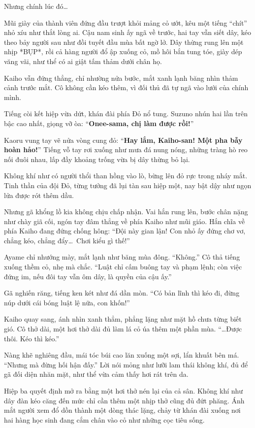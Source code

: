 \documentclass[../main.tex]{subfiles}
\begin{document}
Nhưng chính lúc đó\dots

Mũi giày của thành viên đứng đầu trượt khỏi mảng cỏ ướt, kêu một tiếng ``chít'' nhỏ xíu như thắt lòng ai.
Cậu nam sinh ấy ngã về trước, hai tay vẫn siết dây, kéo theo bảy người sau như đồi tuyết đầu mùa bất ngờ lở. Dây thừng rung lên một nhịp *BỤP*, rồi cả hàng người đổ ập xuống cỏ, mồ hôi bắn tung tóe, giày dép văng vãi, như thể có ai giật tấm thảm dưới chân họ.

Kaiho vẫn đứng thẳng, chỉ nhường nửa bước, mắt xanh lạnh băng nhìn thảm cảnh trước mắt. Cô không cần kéo thêm, vì đối thủ đã tự ngã vào lưới của chính mình.

Tiếng còi kết hiệp vừa dứt, khán đài phía Đỏ nổ tung. Suzuno nhún hai lần trên bậc cao nhất, giọng vỡ òa: ``\textbf{Onee-sama, chị làm được rồi!}''

Kaoru vung tay vẽ nửa vòng cung đỏ: ``\textbf{Hay lắm, Kaiho-san! Một pha bẫy hoàn hảo!}'' Tiếng vỗ tay rơi xuống như mưa đá nung nóng, những tràng hò reo nối đuôi nhau, lấp đầy khoảng trống vừa bị dây thừng bỏ lại.

Không khí như có người thổi than hồng vào lò, bừng lên đỏ rực trong nháy mắt. Tinh thần của đội Đỏ, từng tưởng đã lụi tàn sau hiệp một, nay bật dậy như ngọn lửa được rót thêm dầu.

Nhưng gã khổng lồ kia không chịu chấp nhận. Vai hắn rung lên, bước chân nặng như chày giã cối, ngón tay đâm thẳng về phía Kaiho như mũi giáo. Hắn chĩa về phía Kaiho đang đứng chống hông: ``Đội này gian lận! Con nhỏ ấy đứng chơ vơ, chẳng kéo, chẳng đẩy\dots\ Chơi kiểu gì thế!''

Ayame chỉ nhướng mày, mắt lạnh như băng mùa đông. ``Không.'' Cô thả tiếng xuống thềm cỏ, nhẹ mà chắc.
``Luật chỉ cấm buông tay và phạm lệnh; còn việc đứng im, nếu đôi tay vẫn ôm dây, là quyền của cậu ấy.''

Gã nghiến răng, tiếng ken két như đá dần mòn. ``Có bản lĩnh thì kéo đi, đừng núp dưới cái bóng luật lệ nữa, con khốn!''

Kaiho quay sang, ánh nhìn xanh thẳm, phẳng lặng như mặt hồ chưa từng biết gió. Cô thở dài, một hơi thở dài đủ làm lá cỏ úa thêm một phần mùa. ``\dots Được thôi. Kéo thì kéo.''

Nàng khẽ nghiêng đầu, mái tóc búi cao lăn xuống một sợi, lẩn khuất bên má. ``Nhưng mà đừng hối hận đấy.'' Lời nói mỏng như lưỡi lam thái không khí, đủ để gã đối diện nhăn mặt, như thể vừa cảm thấy hơi rát trên da.

\ct

Hiệp ba quyết định mở ra bằng một hơi thở nén lại của cả sân. Không khí như dây đàn kéo căng đến mức chỉ cần thêm một nhịp thở cũng đủ đứt phăng. Ánh mắt người xem đổ dồn thành một dòng thác lặng, chảy từ khán đài xuống nơi hai hàng học sinh đang cắm chân vào cỏ như những cọc tiêu sống.
\end{document}
